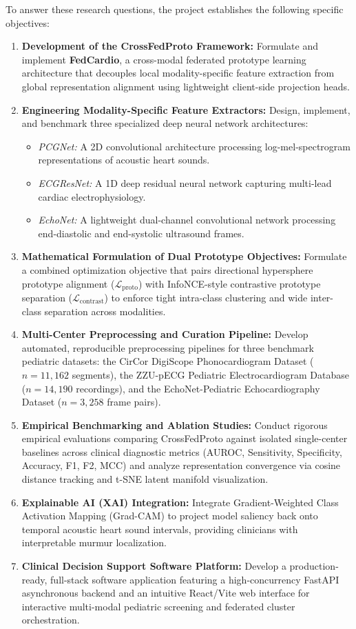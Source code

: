 \documentclass[12pt,a4paper]{amritareport}
\begin{document}
To answer these research questions, the project establishes the following specific objectives:
\begin{enumerate}
	\item \textbf{Development of the CrossFedProto Framework:} Formulate and implement \textbf{FedCardio}, a cross-modal federated prototype learning architecture that decouples local modality-specific feature extraction from global representation alignment using lightweight client-side projection heads.
	\item \textbf{Engineering Modality-Specific Feature Extractors:} Design, implement, and benchmark three specialized deep neural network architectures:
	\begin{itemize}
		\item \textit{PCGNet:} A 2D convolutional architecture processing log-mel-spectrogram representations of acoustic heart sounds.
		\item \textit{ECGResNet:} A 1D deep residual neural network capturing multi-lead cardiac electrophysiology.
		\item \textit{EchoNet:} A lightweight dual-channel convolutional network processing end-diastolic and end-systolic ultrasound frames.
	\end{itemize}
	\item \textbf{Mathematical Formulation of Dual Prototype Objectives:} Formulate a combined optimization objective that pairs directional hypersphere prototype alignment ($\mathcal{L}_{\text{proto}}$) with InfoNCE-style contrastive prototype separation ($\mathcal{L}_{\text{contrast}}$) to enforce tight intra-class clustering and wide inter-class separation across modalities.
	\item \textbf{Multi-Center Preprocessing and Curation Pipeline:} Develop automated, reproducible preprocessing pipelines for three benchmark pediatric datasets: the CirCor DigiScope Phonocardiogram Dataset ($n=11,162$ segments), the ZZU-pECG Pediatric Electrocardiogram Database ($n=14,190$ recordings), and the EchoNet-Pediatric Echocardiography Dataset ($n=3,258$ frame pairs).
	\item \textbf{Empirical Benchmarking and Ablation Studies:} Conduct rigorous empirical evaluations comparing CrossFedProto against isolated single-center baselines across clinical diagnostic metrics (AUROC, Sensitivity, Specificity, Accuracy, F1, F2, MCC) and analyze representation convergence via cosine distance tracking and t-SNE latent manifold visualization.
	\item \textbf{Explainable AI (XAI) Integration:} Integrate Gradient-Weighted Class Activation Mapping (Grad-CAM) to project model saliency back onto temporal acoustic heart sound intervals, providing clinicians with interpretable murmur localization.
	\item \textbf{Clinical Decision Support Software Platform:} Develop a production-ready, full-stack software application featuring a high-concurrency FastAPI asynchronous backend and an intuitive React/Vite web interface for interactive multi-modal pediatric screening and federated cluster orchestration.
\end{enumerate}
\end{document}
